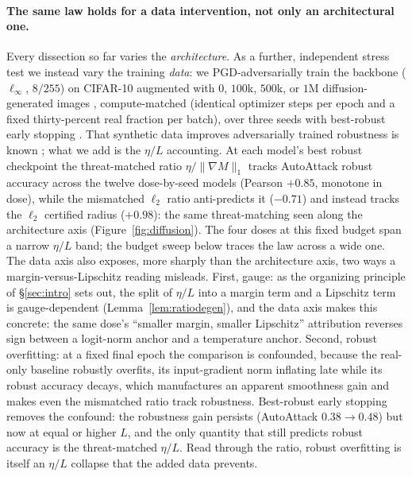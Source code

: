 \documentclass{article}
\theoremstyle{definition}
\begin{document}
\paragraph{The same law holds for a data intervention, not only an architectural one.} Every dissection so far varies the \emph{architecture}. As a further, independent stress test we instead vary the training \emph{data}: we PGD-adversarially train the backbone ($\ell_\infty$, $8/255$) on CIFAR-10 augmented with $0$, $100$k, $500$k, or $1$M diffusion-generated images \citep{wang2023better}, compute-matched (identical optimizer steps per epoch and a fixed thirty-percent real fraction per batch), over three seeds with best-robust early stopping \citep{rice2020overfitting}. That synthetic data improves adversarially trained robustness is known \citep{wang2023better,gowal2021improving}; what we add is the $\eta/L$ accounting. At each model's best robust checkpoint the threat-matched ratio $\eta/\|\nabla M\|_1$ tracks AutoAttack robust accuracy across the twelve dose-by-seed models (Pearson $+0.85$, monotone in dose), while the mismatched $\ell_2$ ratio anti-predicts it ($-0.71$) and instead tracks the $\ell_2$ certified radius ($+0.98$): the same threat-matching seen along the architecture axis (Figure~\ref{fig:diffusion}). The four doses at this fixed budget span a narrow $\eta/L$ band; the budget sweep below traces the law across a wide one. The data axis also exposes, more sharply than the architecture axis, two ways a margin-versus-Lipschitz reading misleads. First, gauge: as the organizing principle of \S\ref{sec:intro} sets out, the split of $\eta/L$ into a margin term and a Lipschitz term is gauge-dependent (Lemma~\ref{lem:ratiodegen}), and the data axis makes this concrete: the same dose's ``smaller margin, smaller Lipschitz'' attribution reverses sign between a logit-norm anchor and a temperature anchor. Second, robust overfitting: at a fixed final epoch the comparison is confounded, because the real-only baseline robustly overfits, its input-gradient norm inflating late while its robust accuracy decays, which manufactures an apparent smoothness gain and makes even the mismatched ratio track robustness. Best-robust early stopping removes the confound: the robustness gain persists (AutoAttack $0.38\to0.48$) but now at equal or higher $L$, and the only quantity that still predicts robust accuracy is the threat-matched $\eta/L$. Read through the ratio, robust overfitting is itself an $\eta/L$ collapse that the added data prevents.
\end{document}
